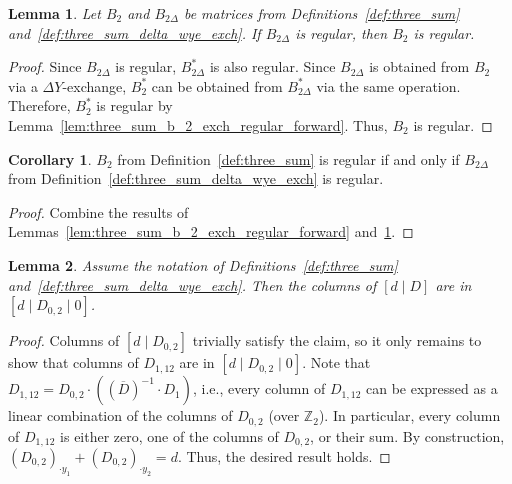 \documentclass{article}
\newtheorem{lemma}{Lemma}
\theoremstyle{definition}
\newtheorem{corollary}{Corollary}
\begin{document}
\begin{lemma}\label{lem:three_sum_b_2_exch_regular_backward}
    Let $B_{2}$ and $B_{2 \Delta}$ be matrices from Definitions~\ref{def:three_sum} and~\ref{def:three_sum_delta_wye_exch}. If $B_{2 \Delta}$ is regular, then $B_{2}$ is regular. %
\end{lemma}

\begin{proof}
    Since $B_{2 \Delta}$ is regular, $B_{2 \Delta}^{*}$ is also regular. Since $B_{2 \Delta}$ is obtained from $B_{2}$ via a $\Delta Y$-exchange, $B_{2}^{*}$ can be obtained from $B_{2 \Delta}^{*}$ via the same operation. Therefore, $B_{2}^{*}$ is regular by Lemma~\ref{lem:three_sum_b_2_exch_regular_forward}. Thus, $B_{2}$ is regular.
\end{proof}

\begin{corollary}
    $B_{2}$ from Definition~\ref{def:three_sum} is regular if and only if $B_{2 \Delta}$ from Definition~\ref{def:three_sum_delta_wye_exch} is regular.
\end{corollary}

\begin{proof}
    Combine the results of Lemmas~\ref{lem:three_sum_b_2_exch_regular_forward} and~\ref{lem:three_sum_b_2_exch_regular_backward}.
\end{proof}

\begin{lemma}\label{lem:three_sum_columns_of_d_D}
    Assume the notation of Definitions~\ref{def:three_sum} and~\ref{def:three_sum_delta_wye_exch}. Then the columns of  $[d \mid D]$ are in $[d \mid D_{0, 2} \mid 0]$.
\end{lemma}

\begin{proof}
    Columns of $[d \mid D_{0, 2}]$ trivially satisfy the claim, so it only remains to show that columns of $D_{1, 12}$ are in $[d \mid D_{0, 2} \mid 0]$. Note that $D_{1, 12} = D_{0, 2} \cdot ((\overline{D})^{-1} \cdot D_{1})$, i.e., every column of $D_{1, 12}$ can be expressed as a linear combination of the columns of $D_{0, 2}$ (over $\mathbb{Z}_{2}$). In particular, every column of $D_{1, 12}$ is either zero, one of the columns of $D_{0, 2}$, or their sum. By construction, $(D_{0, 2})_{\cdot y_{1}} + (D_{0, 2})_{\cdot y_{2}} = d$. Thus, the desired result holds.
\end{proof}
\end{document}
